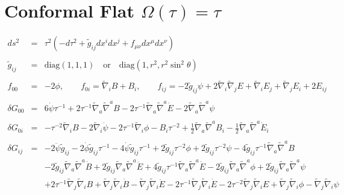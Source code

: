 \documentclass[10pt,letterpaper]{article}
\numberwithin{equation}{section}
\begin{document}
\section{Conformal Flat $\Omega(\tau)=\tau$}
%
\begin{eqnarray}
ds^2 &=& \tau^2(-d\tau^2 + \tilde g_{ij} dx^i dx^j + f_{\mu\nu} dx^\mu dx^\nu)
\\ \nonumber\\
\tilde g_{ij} &=& \text{diag}(1,1,1)\quad\text{or}\quad \text{diag}(1,r^2,r^2\sin^2\theta)
\\ \nonumber\\
f_{00} &=& -2\phi,\qquad f_{0i}= \tilde \nabla_i B + B_i,\qquad 
f_{ij} = -2 \tilde g_{ij}\psi + 2\tilde\nabla_i\tilde \nabla_j E + \tilde \nabla_i E_j + \tilde \nabla_j E_i + 2E_{ij}
\\ \nonumber\\
\delta G_{00} &=& 6 \dot{\psi} \tau^{-1}
+ 2 \tau^{-1} \tilde{\nabla}_{a}\tilde{\nabla}^{a}B
- 2 \tau^{-1} \tilde{\nabla}_{a}\tilde{\nabla}^{a}\dot{E}
- 2 \tilde{\nabla}_{a}\tilde{\nabla}^{a}\psi
\\ \nonumber\\
\delta G_{0i} &=& - \tau^{-2} \tilde\nabla_{i}B
- 2 \tilde\nabla_{i}\dot{\psi}
- 2 \tau^{-1} \tilde\nabla_{i}\phi
- B_{i} \tau^{-2}
+ \tfrac{1}{2} \tilde\nabla_{a}\tilde\nabla^{a}B_{i}
-  \tfrac{1}{2} \tilde\nabla_{a}\tilde\nabla^{a}\dot{E}_{i}
\\ \nonumber\\
\delta G_{ij}&=&-2 \ddot{\psi} \tilde g_{ij}
- 2 \dot{\phi} \tilde g_{ij} \tau^{-1}
- 4 \dot{\psi} \tilde g_{ij} \tau^{-1}
+ 2 \tilde g_{ij} \tau^{-2} \phi
+ 2 \tilde g_{ij} \tau^{-2} \psi
- 4 \tilde g_{ij} \tau^{-1} \tilde\nabla_{a}\tilde\nabla^{a}B\nonumber\\
&& - 2 \tilde g_{ij} \tilde\nabla_{a}\tilde\nabla^{a}\dot{B}
+ 2 \tilde g_{ij} \tilde\nabla_{a}\tilde\nabla^{a}\ddot{E}
+ 4 \tilde g_{ij} \tau^{-1} \tilde\nabla_{a}\tilde\nabla^{a}\dot{E}
- 2 \tilde g_{ij} \tilde\nabla_{a}\tilde\nabla^{a}\phi
+ 2 \tilde g_{ij} \tilde\nabla_{a}\tilde\nabla^{a}\psi\nonumber\\
&& + 2 \tau^{-1} \tilde\nabla_{j}\tilde\nabla_{i}B
+ \tilde\nabla_{j}\tilde\nabla_{i}\dot{B}
-  \tilde\nabla_{j}\tilde\nabla_{i}\ddot{E}
- 2 \tau^{-1} \tilde\nabla_{j}\tilde\nabla_{i}\dot{E}
- 2 \tau^{-2} \tilde\nabla_{j}\tilde\nabla_{i}E
+ \tilde\nabla_{j}\tilde\nabla_{i}\phi
-  \tilde\nabla_{j}\tilde\nabla_{i}\psi
\nonumber\\

\end{eqnarray}
\end{document}
